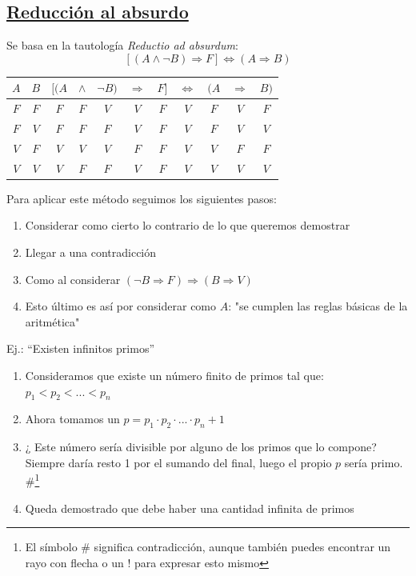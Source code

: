 \documentclass[10pt,a4paper,openright]{book}
\begin{document}
\subsection*{\underline{Reducción al absurdo}}
Se basa en la tautología \textit{Reductio ad absurdum}:
$$[(A\wedge \neg B)\Rightarrow F] \Leftrightarrow (A \Rightarrow B)$$
\begin{center}
   \begin{tabular}{|c|c|c|c|c|c|c|c|c|c|c|}
   \hline
     $A$ & $B$ & $[(A$ & $\wedge $ & $\neg B)$ & $\Rightarrow $ & $F]$ & $\Leftrightarrow $ & $(A$ & $\Rightarrow $ & $B)$  \\ [0.5ex] 
   \hline \hline
     $F$ & $F$ & $F$ & $F$ & $V$ & $V$ & $F$ & $V$ & $F$ & $V$ & $F$\\
   \hline 
     $F$ & $V$ & $F$ & $F$ & $F$ & $V$ & $F$ & $V$ & $F$ & $V$ & $V$\\
   \hline
     $V$ & $F$ & $V$ & $V$ & $V$ & $F$ & $F$ & $V$ & $V$ & $F$ & $F$\\
   \hline
     $V$ & $V$ & $V$ & $F$ & $F$ & $V$ & $F$ & $V$ & $V$ & $V$ & $V$\\
   \hline
   \end{tabular}
\end{center}
Para aplicar este método seguimos los siguientes pasos:
\begin{enumerate}
\item Considerar como cierto lo contrario de lo que queremos demostrar
\item Llegar a una contradicción
\item Como al considerar $(\neg B \Rightarrow F) \Rightarrow (B\Rightarrow V)$
\item Esto último es así por considerar como $A$: "se cumplen las reglas básicas de la aritmética"
\end{enumerate}
\vspace{1cm}
Ej.: “Existen infinitos primos”
\begin{enumerate}
\item Consideramos que existe un número finito de primos tal que:  $p_1<p_2<...<p_n$\item Ahora tomamos un $p=p_1 \cdot p_2 \cdot ... \cdot p_n +1$
\item ¿ Este número sería divisible por alguno de los primos que lo compone? Siempre daría resto 1 por el sumando del final, luego el propio $p$ sería primo. \#\footnote{El símbolo \# significa contradicción, aunque también puedes encontrar un rayo con flecha o un ! para expresar esto mismo}
\item Queda demostrado que debe haber una cantidad infinita de primos
\end{enumerate}
\end{document}

